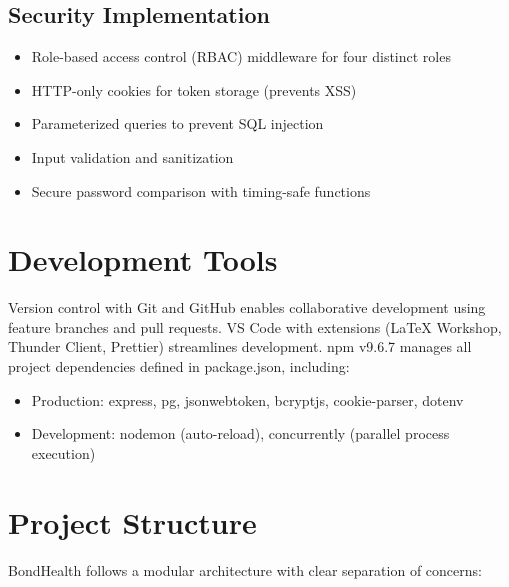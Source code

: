 \subsection{Security Implementation}
\begin{itemize}
    \item Role-based access control (RBAC) middleware for four distinct roles
    \item HTTP-only cookies for token storage (prevents XSS)
    \item Parameterized queries to prevent SQL injection
    \item Input validation and sanitization
    \item Secure password comparison with timing-safe functions
\end{itemize}

\section{Development Tools}

Version control with Git and GitHub enables collaborative development using feature branches and pull requests. VS Code with extensions (LaTeX Workshop, Thunder Client, Prettier) streamlines development. npm v9.6.7 manages all project dependencies defined in package.json, including:

\begin{itemize}
    \item Production: express, pg, jsonwebtoken, bcryptjs, cookie-parser, dotenv
    \item Development: nodemon (auto-reload), concurrently (parallel process execution)
\end{itemize}

\section{Project Structure}

BondHealth follows a modular architecture with clear separation of concerns:

